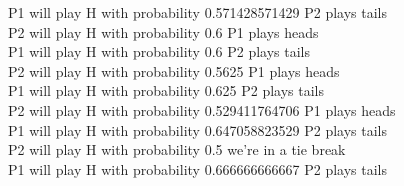 \documentclass[11pt]{article}
\begin{document}
P1 will play H with probability 0.571428571429  P2 plays tails\\
P2 will play H with probability 0.6  P1 plays heads\\
P1 will play H with probability 0.6  P2 plays tails\\
P2 will play H with probability 0.5625  P1 plays heads\\
P1 will play H with probability 0.625  P2 plays tails\\
P2 will play H with probability 0.529411764706  P1 plays heads\\
P1 will play H with probability 0.647058823529  P2 plays tails\\
P2 will play H with probability 0.5  we're in a tie break\\
P1 will play H with probability 0.666666666667  P2 plays tails\\
\end{document}

